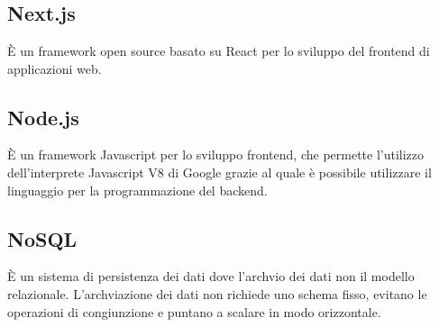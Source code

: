 \section{}
\subsection*{Next.js} È un framework open source basato su React per lo sviluppo del frontend di applicazioni web.

\subsection*{Node.js} È un framework Javascript per lo sviluppo frontend, che permette l'utilizzo dell'interprete Javascript V8 di Google grazie al quale è possibile utilizzare il linguaggio per la programmazione del backend.

\subsection*{NoSQL} È un sistema di persistenza dei dati dove l'archvio dei dati non il modello relazionale. L'archviazione dei dati non richiede uno schema fisso, evitano le operazioni di congiunzione e puntano a scalare in modo orizzontale.